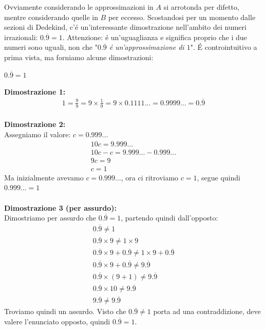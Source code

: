 \documentclass[twoside]{article} %
\begin{document}
	Ovviamente considerando le approssimazioni in $A$ si arrotonda per difetto, mentre considerando quelle in $B$ per eccesso.
	\newpage
	\noindent Scostandosi per un momento dalle sezioni di Dedekind, c'\'e un'interessante dimostrazione nell'ambito dei numeri irrazionali: $0.\overline{9}=1$. Attenzione: \'e un'uguaglianza e significa proprio che i due numeri sono  uguali, non che "\textit{$0.\overline{9}$ \'e un'approssimazione di $1$}". \'E controintuitivo a prima vista, ma forniamo alcune dimostrazioni:
	\begin{mdframed}[linewidth=1.5pt]
		\begin{center}
			{\large \boldmath$0.\overline{9}=1$}
		\end{center}
		\noindent \textbf{Dimostrazione 1:}\\
		\begin{gather*}
			1=\frac{9}{9}=9\times \frac{1}{9}=9\times 0.1111...=0.9999...=0.\overline{9}
		\end{gather*}
		\\\textbf{Dimostrazione 2:}\\
		Assegniamo il valore: $c=0.999...$
		\begin{gather*}
			10c=9.999...\\
			10c-c=9.999...-0.999...\\
			9c=9\\
			c=1
		\end{gather*}
		Ma inizialmente avevamo $c=0.999...$, ora ci ritroviamo $c=1$, segue quindi $0.999...=1$\\ \\
		\textbf{Dimostrazione 3 (per assurdo):}\\
		Dimostriamo per assurdo che $0.\overline{9}=1$, partendo quindi dall'opposto:		
		\begin{gather*}
			0.\overline{9}\neq 1\\
			0.\overline{9}\times 9\neq 1\times 9\\
			0.\overline{9}\times 9+0.\overline{9}\neq 1\times 9+ 0.\overline{9}\\
			0.\overline{9}\times 9+0.\overline{9}\neq 9.\overline{9}\\
			0.\overline{9}\times (9+1)\neq 9.\overline{9}\\
			0.\overline{9}\times 10\neq 9.\overline{9}\\
			9.\overline{9}\neq 9.\overline{9}
		\end{gather*}
			Troviamo quindi un assurdo. Visto che $0.\overline{9}\neq 1$ porta ad una contraddizione, deve valere l'enunciato opposto, quindi $0.\overline{9}=1$.		
	\end{mdframed}
\end{document}
